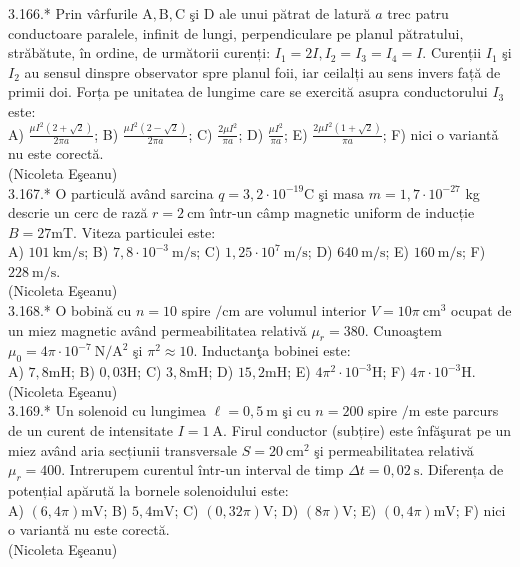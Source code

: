 3.166.* Prin vârfurile $\mathrm{A}, \mathrm{B}, \mathrm{C}$ şi $\mathrm{D}$ ale unui pătrat de latură $a$ trec patru conductoare paralele, infinit de lungi, perpendiculare pe planul pătratului, străbătute, în ordine, de următorii curenți: $I_{1}=2 I, I_{2}=I_{3}=I_{4}=I$. Curenții $I_{1}$ şi $I_{2}$ au sensul dinspre observator spre planul foii, iar ceilalți au sens invers față de primii doi. Forța pe unitatea de lungime care se exercită asupra conductorului $I_{3}$ este:\\ A) $\frac{\mu I^{2}(2+\sqrt{2})}{2 \pi a}$; B) $\frac{\mu I^{2}(2-\sqrt{2})}{2 \pi a}$; C) $\frac{2 \mu I^{2}}{\pi a}$; D) $\frac{\mu I^{2}}{\pi a}$; E) $\frac{2 \mu I^{2}(1+\sqrt{2})}{\pi a}$; F) nici o variantǎ nu este corectă.\\ (Nicoleta Eşeanu)\\

3.167.* O particulă având sarcina $q=3,2 \cdot 10^{-19} \mathrm{C}$ şi masa $m=1,7 \cdot 10^{-27}$ kg descrie un cerc de rază $r=2 \mathrm{~cm}$ într-un câmp magnetic uniform de inducție $B=27 \mathrm{mT}$. Viteza particulei este:\\ A) $101 \mathrm{~km} / \mathrm{s}$; B) $7,8 \cdot 10^{-3} \mathrm{~m} / \mathrm{s}$; C) $1,25 \cdot 10^{7} \mathrm{~m} / \mathrm{s}$; D) $640 \mathrm{~m} / \mathrm{s}$; E) $160 \mathrm{~m} / \mathrm{s}$; F) $228 \mathrm{~m} / \mathrm{s}$.\\ (Nicoleta Eşeanu)\\

3.168.* O bobină cu $n=10$ spire $/ \mathrm{cm}$ are volumul interior $V=10 \pi \mathrm{~cm}^{3}$ ocupat de un miez magnetic având permeabilitatea relativă $\mu_{r}=380$. Cunoaştem $\mu_{0}=4 \pi \cdot 10^{-7} \mathrm{~N} / \mathrm{A}^{2}$ şi $\pi^{2} \approx 10$. Inductanţa bobinei este:\\ A) $7,8 \mathrm{mH}$; B) $0,03 \mathrm{H}$; C) $3,8 \mathrm{mH}$; D) $15,2 \mathrm{mH}$; E) $4 \pi^{2} \cdot 10^{-3} \mathrm{H}$; F) $4 \pi \cdot 10^{-3} \mathrm{H}$.\\ (Nicoleta Eşeanu)\\

3.169.* Un solenoid cu lungimea $\ell=0,5 \mathrm{~m}$ şi cu $n=200$ spire $/ \mathrm{m}$ este parcurs de un curent de intensitate $I=1 \mathrm{~A}$. Firul conductor (subțire) este înfăşurat pe un miez având aria secțiunii transversale $S=20 \mathrm{~cm}^{2}$ şi permeabilitatea relativă $\mu_{r}=400$. Intrerupem curentul într-un interval de timp $\Delta t=0,02 \mathrm{~s}$. Diferența de potențial apărută la bornele solenoidului este:\\ A) $(6,4 \pi) \mathrm{mV}$; B) $5,4 \mathrm{mV}$; C) $(0,32 \pi) \mathrm{V}$; D) $(8 \pi) \mathrm{V}$; E) $(0,4 \pi) \mathrm{mV}$; F) nici o variantă nu este corectă.\\ (Nicoleta Eşeanu)\\

